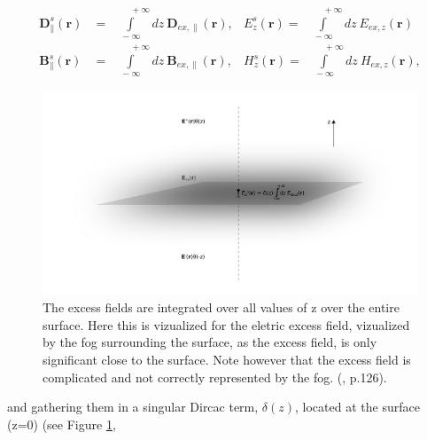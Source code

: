 \begin{subequations}
\label{intExQuant} %
\begin{align}
   \boldsymbol{D}^s_{\parallel}(\boldsymbol{r}) &= \!\!\!\!\!\!\!\!\! \int\limits ^{\:\:\:\:\:\:\:\:\:\:+\infty}_{\!\!\!\!\!\!\!\!\!\!\!\!\!\!\!-\infty} \!\!\!\!\!\!\!\!\! d\!z\: \boldsymbol{D}\!_{ex,\parallel}(\boldsymbol{r}),
   &E^s_{z}(\boldsymbol{r}) = \!\!\!\!\!\!\!\!\! \int\limits ^{\:\:\:\:\:\:\:\:\:\:+\infty}_{\!\!\!\!\!\!\!\!\!\!\!\!\!\!\!-\infty} \!\!\!\!\!\!\!\!\! d\!z\: E\!_{ex,z}(\boldsymbol{r}) \label{intExQuant1}\\
   \boldsymbol{B}^s_{\parallel}(\boldsymbol{r}) &= \!\!\!\!\!\!\!\!\! \int\limits ^{\:\:\:\:\:\:\:\:\:\:+\infty}_{\!\!\!\!\!\!\!\!\!\!\!\!\!\!\!-\infty} \!\!\!\!\!\!\!\!\! d\!z\: \boldsymbol{B}\!_{ex,\parallel}(\boldsymbol{r}),
   &H^s_{z}(\boldsymbol{r}) = \!\!\!\!\!\!\!\!\! \int\limits ^{\:\:\:\:\:\:\:\:\:\:+\infty}_{\!\!\!\!\!\!\!\!\!\!\!\!\!\!\!-\infty} \!\!\!\!\!\!\!\!\! d\!z\: H\!_{ex,z}(\boldsymbol{r}), \label{intExQuant2}
\end{align}
\end{subequations}
%
\begin{figure}[h!]
  \centering
   \includegraphics[width=1.0\textwidth]{Figures/excessFields.pdf}
   \caption{The excess fields are integrated over all values of z over the entire surface. Here this 
      is vizualized for the eletric excess field, vizualized by the fog surrounding the surface, as
      the excess field, is only significant close to the surface. Note however that the excess field
      is complicated and not correctly represented by the fog.  (\cite{Lazzari2002}, p.126).
   }
   \label{fig:excessFields}
\end{figure}
%
and gathering them in a singular Dircac term, $\delta(z)$, located at the surface (z=0)
(see Figure \ref{fig:excessFields},
